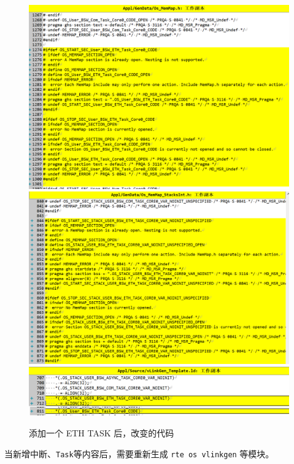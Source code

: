 \begin{figure}[htbp]
    \centering
    \includegraphics[scale=0.6]{pic/add_task_generate_mode_code_1.png}
    \includegraphics[scale=0.6]{pic/add_task_generate_mode_code_2.png}
    \includegraphics[scale=0.6]{pic/add_task_generate_mode_code_3.png}
    \caption{添加一个 ETH TASK 后，改变的代码}
    \label{fig:add_task_generate_mode_code}
\end{figure}

\begin{definition}[解决方案]
    当新增中断、\lstinline{Task}等内容后，需要重新生成 \lstinline{rte os vlinkgen} 等模块。
\end{definition}

